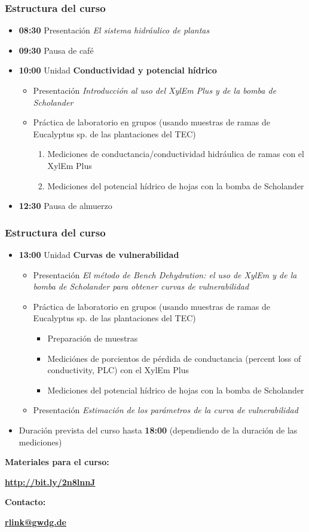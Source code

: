 \documentclass[usepdftitle=false]{beamer}
\newcommand{\Blue}[1]{{\color{blue!50!black}\textbf{#1}}}
\begin{document}
\begin{frame}
	\frametitle{Estructura del curso}
	\begin{itemize}
		\item \Blue{08:30} Presentación \textit{El sistema hidráulico de plantas}
		\item \Blue{09:30} Pausa de café
		\item \Blue{10:00} Unidad \textbf{Conductividad y potencial hídrico}
		\begin{itemize}
			\item Presentación \textit{Introducción al uso del XylEm Plus y de la bomba de Scholander}
			\item Práctica de laboratorio en grupos (usando muestras de ramas de Eucalyptus sp. de las plantaciones del TEC)
			\begin{enumerate}
				\item Mediciones de conductancia/conductividad hidráulica de ramas con el XylEm Plus
				\item  Mediciones del potencial hídrico de hojas con la bomba de Scholander
			\end{enumerate}	  
	   \end{itemize}
	   \item \Blue{12:30} Pausa de almuerzo
   \end{itemize}
\end{frame}


\begin{frame}
	\frametitle{Estructura del curso}
	\begin{itemize}
		\item \Blue{13:00} Unidad \textbf{Curvas de vulnerabilidad}
		\begin{itemize}
			\item  Presentación \textit{El método de Bench Dehydration: el uso de XylEm y de la bomba de Scholander para obtener curvas de vulnerabilidad}
			\item Práctica de laboratorio en grupos (usando muestras de ramas de Eucalyptus sp. de las plantaciones del TEC)
			\begin{itemize}
				\item Preparación de muestras
				\item Mediciónes de porcientos de pérdida de conductancia (percent loss of conductivity, PLC) con el XylEm Plus
				\item Mediciones del potencial hídrico de hojas con la bomba de Scholander
			\end{itemize}
			\item Presentación \textit{Estimación de los parámetros de la curva de vulnerabilidad}
		\end{itemize}	
		\item Duración prevista del curso hasta \Blue{18:00} (dependiendo de la duración de las mediciones)	
	\end{itemize}
\end{frame}

\begin{frame}

\huge
\textbf{Materiales para el curso:}


\Blue{\url{http://bit.ly/2n8lnnJ}}

\vspace{0.5em}
\textbf{Contacto:} 

\Blue{\href{mailto:rlink@gwdg.de}{rlink@gwdg.de}}
\end{frame}
\end{document}
